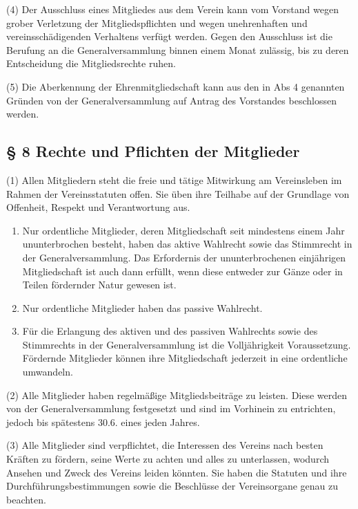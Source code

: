 \documentclass[10pt,a4paper]{article}
\begin{document}
(4)
Der Ausschluss eines Mitgliedes aus dem Verein kann vom Vorstand wegen grober Verletzung der Mitgliedspflichten und wegen unehrenhaften und vereinsschädigenden Verhaltens verfügt werden.
Gegen den Ausschluss ist die Berufung an die Generalversammlung binnen einem Monat zulässig, bis zu deren Entscheidung die Mitgliedsrechte ruhen.

(5)
Die Aberkennung der Ehrenmitgliedschaft kann aus den in Abs 4 genannten Gründen von der Generalversammlung auf Antrag des Vorstandes beschlossen werden.

\subsection{§ 8
Rechte und Pflichten der Mitglieder}

(1)
Allen Mitgliedern steht die freie und tätige Mitwirkung am Vereinsleben im Rahmen der Vereinsstatuten offen.
Sie üben ihre Teilhabe auf der Grundlage von Offenheit, Respekt und Verantwortung aus.

\begin{enumerate}[label=\alph*)]
\item
Nur ordentliche Mitglieder, deren Mitgliedschaft seit mindestens einem Jahr ununterbrochen besteht, haben das aktive Wahlrecht sowie das Stimmrecht in der Generalversammlung.
Das Erfordernis der ununterbrochenen einjährigen Mitgliedschaft ist auch dann erfüllt, wenn diese entweder zur Gänze oder in Teilen fördernder Natur gewesen ist.
\item
Nur ordentliche Mitglieder haben das passive Wahlrecht.
\item
Für die Erlangung des aktiven und des passiven Wahlrechts sowie des Stimmrechts in der Generalversammlung ist die Volljährigkeit Voraussetzung.
Fördernde Mitglieder können ihre Mitgliedschaft jederzeit in eine ordentliche umwandeln.
\end{enumerate}

(2)
Alle Mitglieder haben regelmäßige Mitgliedsbeiträge zu leisten.
Diese werden von der Generalversammlung festgesetzt und sind im Vorhinein zu entrichten, jedoch bis spätestens 30.6. eines jeden Jahres.

(3)
Alle Mitglieder sind verpflichtet, die Interessen des Vereins nach besten Kräften zu fördern, seine Werte zu achten und alles zu unterlassen, wodurch Ansehen und Zweck des Vereins leiden könnten.
Sie haben die Statuten und ihre Durchführungsbestimmungen sowie die Beschlüsse der Vereinsorgane genau zu beachten.
\end{document}
